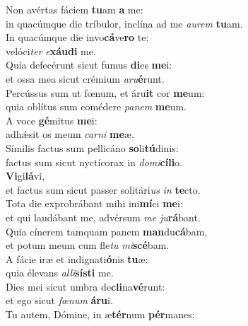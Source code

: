 \evenverse Non avértas fáciem \textbf{tu}am \textbf{a} me:~\*\\
\evenverse in quacúmque die tríbulor, inclína ad me \textit{au}\textit{rem} \textbf{tu}am.\\
\oddverse In quacúmque die invo\textbf{cá}ve\textbf{ro} te:~\*\\
\oddverse velóci\textit{ter} \textit{e}\textbf{xáu}\textbf{di} me.\\
\evenverse Quia defecérunt sicut fumus \textbf{di}es \textbf{me}i:~\*\\
\evenverse et ossa mea sicut crémium \textit{a}\textit{ru}\textbf{é}runt.\\
\oddverse Percússus sum ut fœnum, et áru\textbf{it} cor \textbf{me}um:~\*\\
\oddverse quia oblítus sum comédere \textit{pa}\textit{nem} \textbf{me}um.\\
\evenverse A voce \textbf{gé}mitus \textbf{me}i:~\*\\
\evenverse adhǽsit os meum \textit{car}\textit{ni} \textbf{me}æ.\\
\oddverse Símilis factus sum pellicáno \textbf{so}li\textbf{tú}dinis:~\*\\
\oddverse factus sum sicut nyctícorax in \textit{do}\textit{mi}\textbf{cí}\textbf{li}o.\\
\evenverse \textbf{Vi}gi\textbf{lá}vi,~\*\\
\evenverse et factus sum sicut passer solitári\textit{us} \textit{in} \textbf{te}cto.\\
\oddverse Tota die exprobrábant mihi ini\textbf{mí}ci \textbf{me}i:~\*\\
\oddverse et qui laudábant me, advérsum \textit{me} \textit{ju}\textbf{rá}bant.\\
\evenverse Quia cínerem tamquam panem \textbf{man}du\textbf{cá}bam,~\*\\
\evenverse et potum meum cum fle\textit{tu} \textit{mi}\textbf{scé}bam.\\
\oddverse A fácie iræ et indignati\textbf{ó}nis \textbf{tu}æ:~\*\\
\oddverse quia élevans \textit{al}\textit{li}\textbf{sí}\textbf{sti} me.\\
\evenverse Dies mei sicut umbra de\textbf{cli}na\textbf{vé}runt:~\*\\
\evenverse et ego sicut \textit{fœ}\textit{num} \textbf{á}\textbf{ru}i.\\
\oddverse Tu autem, Dómine, in æ\textbf{tér}num \textbf{pér}manes:~\*\\
